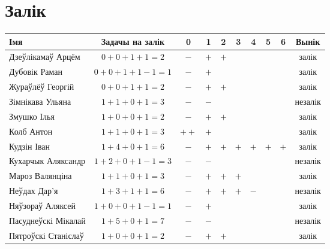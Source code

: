 \documentclass[12pt, a4paper]{extarticle}
\begin{document}
    \section{Залік}
    \begin{table}[H]
        \begin{minipage}{\textwidth}
            \begin{tabular}{|l|c|c|c|c|c|c|c|c|c|}
                \hline
                Імя                 & Задачы на залік &  0   &  1  &  2  &  3  &  4  &  5  &  6  &  Вынік  \\ \hline
                Дзеўлікамаў Арцём   &   $0+0+1+1=2$   & $-$  & $+$ & $+$ &     &     &     &     &  залік  \\ \hline
                Дубовік Раман       &  $0+0+1+1-1=1$  & $-$  & $+$ &     &     &     &     &     &  залік  \\ \hline
                Жураўлёў Георгій    &   $0+0+1+1=2$   & $-$  & $+$ & $+$ &     &     &     &     &  залік  \\ \hline
                Зімнікава Ульяна    &   $1+1+0+1=3$   & $-$  & $-$ &     &     &     &     &     & незалік \\ \hline
                Змушко Ілья         &   $1+0+0+1=2$   & $-$  & $+$ & $+$ &     &     &     &     &  залік  \\ \hline
                Колб Антон          &   $1+1+0+1=3$   & $++$ & $+$ &     &     &     &     &     &  залік  \\ \hline
                Кудзін Іван         &   $1+4+0+1=6$   & $-$  & $+$ & $+$ & $+$ & $+$ & $+$ & $+$ &  залік  \\ \hline
                Кухарчык Аляксандр  &  $1+2+0+1-1=3$  & $-$  & $-$ &     &     &     &     &     & незалік \\ \hline
                Мароз Валянціна     &   $1+1+0+1=3$   & $-$  & $+$ & $+$ & $+$ &     &     &     &  залік  \\ \hline
                Неўдах Дар'я        &   $1+3+1+1=6$   & $-$  & $+$ & $+$ & $+$ & $-$ &     &     & незалік \\ \hline
                Няўзораў Аляксей    &  $1+0+0+1-1=1$  & $-$  & $+$ &     &     &     &     &     &  залік  \\ \hline
                Пасуднеўскі Мікалай &   $1+5+0+1=7$   & $-$  & $-$ &     &     &     &     &     & незалік \\ \hline
                Пятроўскі Станіслаў &   $1+0+0+1=2$   & $-$  & $+$ & $+$ &     &     &     &     &  залік  \\ \hline

\end{tabular}
\end{minipage}
\end{table}
\end{document}
